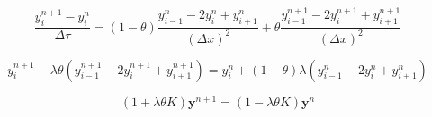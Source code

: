 \begin{equation}
  \frac{y^{n+1}_{i} - y^{n}_{i}}{\Delta \tau} = (1-\theta)\frac{y^{n}_{i-1} - 2y^{n}_{i} + y^{n}_{i+1}}{(\Delta x)^2} +  \theta\frac{y^{n+1}_{i-1} - 2y^{n+1}_{i} + y^{n+1}_{i+1}}{(\Delta x)^2}
\end{equation}

\begin{equation}
  y^{n+1}_{i} - \lambda\theta(y^{n+1}_{i-1} - 2y^{n+1}_{i} + y^{n+1}_{i+1}) =  y^{n}_{i} + (1-\theta)\lambda(y^{n}_{i-1} - 2y^{n}_{i} + y^{n}_{i+1})
\end{equation}

\begin{equation}
  (1 + \lambda\theta K)\boldsymbol{y}^{n+1} = (1-\lambda\theta K)\boldsymbol{y}^{n} 
\end{equation}